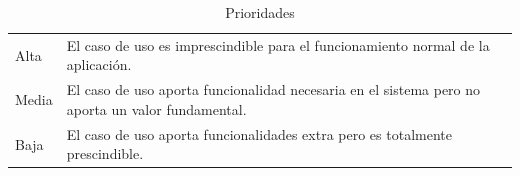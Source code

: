 \begin{table}[htpb]
\centering
\begin{tabularx}{\textwidth}{|l|X|}
\hline
\rowcolor[gray]{0.9}\multicolumn{2}{|c|}{\textbf{Prioridad}}                                                                          \\ \hline
Alta  & El caso de uso es imprescindible para el funcionamiento normal de la aplicación.                 \\ \hline
Media & El caso de uso aporta funcionalidad necesaria en el sistema pero no aporta un valor fundamental. \\ \hline
Baja  & El caso de uso aporta funcionalidades extra pero es totalmente prescindible.                     \\ \hline
\end{tabularx}
\caption{Prioridades}
\label{tab_prior}
\end{table}


